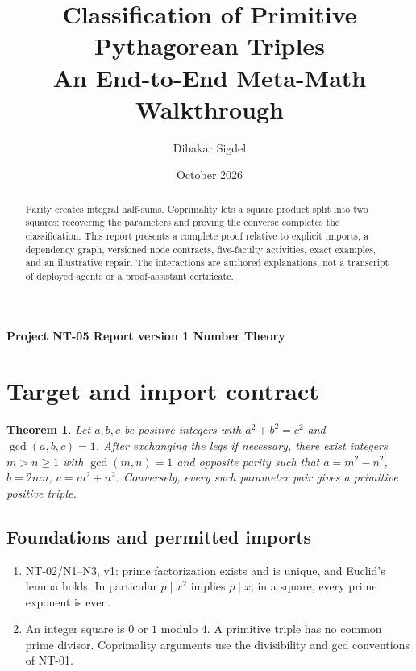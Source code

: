 \documentclass[preprint,12pt,aps,pra,showkeys,amsmath,amssymb,superscriptaddress,floatfix]{revtex4-2}
\newtheorem{theorem}{Theorem}[section]
\theoremstyle{definition}
\theoremstyle{remark}
\begin{document}
\title{Classification of Primitive Pythagorean Triples\\[4pt]\large An End-to-End Meta-Math Walkthrough}

\author{Dibakar Sigdel}


\date{October 2026}

\begin{abstract}

Parity creates integral half-sums. Coprimality lets a square product
split into two squares; recovering the parameters and proving the
converse completes the classification. This report presents a complete
proof relative to explicit imports, a dependency graph, versioned node
contracts, five-faculty activities, exact examples, and an illustrative
repair. The interactions are authored explanations, not a transcript of
deployed agents or a proof-assistant certificate.

\end{abstract}

\maketitle

\linespread{1.12}\selectfont

\noindent\textbf{Project NT-05 \quad Report version 1 \quad Number Theory}

\section{Target and import contract}

\begin{theorem}

Let \(a,b,c\) be positive integers with \(a^2+b^2=c^2\) and
\(\gcd(a,b,c)=1\). After exchanging the legs if necessary, there exist
integers \(m>n\ge1\) with \(\gcd(m,n)=1\) and opposite parity such that
\(a=m^2-n^2\), \(b=2mn\), \(c=m^2+n^2\). Conversely, every such
parameter pair gives a primitive positive triple.

\end{theorem}

\subsection{Foundations and permitted imports}

\begin{enumerate}
\def\labelenumi{\arabic{enumi}.}
\item
  NT-02/N1--N3, v1: prime factorization exists and is unique, and
  Euclid's lemma holds. In particular \(p\mid x^2\) implies \(p\mid x\);
  in a square, every prime exponent is even.
\item
  An integer square is \(0\) or \(1\) modulo \(4\). A primitive triple
  has no common prime divisor. Coprimality arguments use the
  divisibility and gcd conventions of NT-01.
\end{enumerate}
\end{document}
